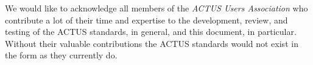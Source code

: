 \documentclass[9pt,oneside]{amsart}
\begin{document}
We would like to acknowledge all members of the \textit{ACTUS Users Association} who contribute a lot of their time and expertise to the development, review, and testing of the ACTUS standards, in general, and this document, in particular. Without their valuable contributions the ACTUS standards would not exist in the form as they currently do.



\newpage
\tableofcontents




\newpage

\setlength{\columnsep}{20pt}
\end{document}

